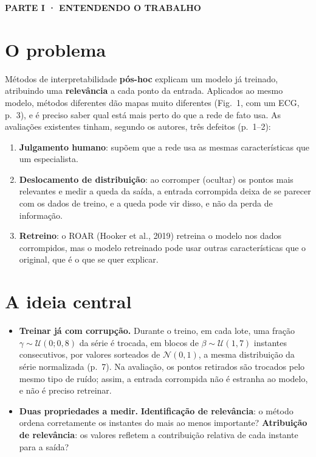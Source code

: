 \documentclass[11pt,a4paper]{article}
\newcommand{\partbar}[1]{\par\vspace{1.2em}\noindent\colorbox{black!80}{\parbox{\dimexpr\linewidth-2\fboxsep}{\color{white}\bfseries\sffamily\MakeUppercase{#1}}}\par\vspace{0.4em}}
\begin{document}
\partbar{Parte I · Entendendo o trabalho}

\section{O problema}
Métodos de interpretabilidade \textbf{pós-hoc} explicam um modelo já treinado, atribuindo uma \textbf{relevância} a cada ponto da entrada. Aplicados ao mesmo modelo, métodos diferentes dão mapas muito diferentes (Fig.~1, com um ECG, p.~3), e é preciso saber qual está mais perto do que a rede de fato usa. As avaliações existentes tinham, segundo os autores, três defeitos (p.~1--2):
\begin{enumerate}
\item \textbf{Julgamento humano}: supõem que a rede usa as mesmas características que um especialista.
\item \textbf{Deslocamento de distribuição}: ao corromper (ocultar) os pontos mais relevantes e medir a queda da saída, a entrada corrompida deixa de se parecer com os dados de treino, e a queda pode vir disso, e não da perda de informação.
\item \textbf{Retreino}: o ROAR (Hooker et al., 2019) retreina o modelo nos dados corrompidos, mas o modelo retreinado pode usar outras características que o original, que é o que se quer explicar.
\end{enumerate}

\section{A ideia central}
\begin{itemize}
\item \textbf{Treinar já com corrupção.} Durante o treino, em cada lote, uma fração $\gamma \sim \mathcal{U}(0; 0{,}8)$ da série é trocada, em blocos de $\beta \sim \mathcal{U}(1, 7)$ instantes consecutivos, por valores sorteados de $\mathcal{N}(0,1)$, a mesma distribuição da série normalizada (p.~7). Na avaliação, os pontos retirados são trocados pelo mesmo tipo de ruído; assim, a entrada corrompida não é estranha ao modelo, e não é preciso retreinar.
\item \textbf{Duas propriedades a medir.} \textbf{Identificação de relevância}: o método ordena corretamente os instantes do mais ao menos importante? \textbf{Atribuição de relevância}: os valores refletem a contribuição relativa de cada instante para a saída?
\end{itemize}
\end{document}
